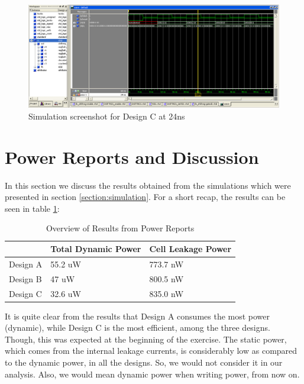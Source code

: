 \documentclass[11pt,a4paper]{article}
\begin{document}
\begin{figure}[htp]
\centering
\includegraphics[length = 4in,width = 6.5in]{./images/simsrg2.png}
\caption{Simulation screenshot for Design C at 24ns}
\end{figure}

\newpage
\section{Power Reports and Discussion}
\label{section:power}

In this section we discuss the results obtained from the simulations which were presented in section \ref{section:simulation}. For a short recap, the results can be seen in table \ref{table:power}:

\begin{table}[htbp]
\begin{center}
\begin{tabular}{|l|l|l|}
\hline
\textbf{}	& \textbf{Total Dynamic Power}		& \textbf{Cell Leakage Power}\\ \hline
Design A &	55.2 uW				& 773.7 nW \\ \hline
Design B &	47 uW					& 800.5 nW \\ \hline
Design C &  32.6 uW				& 835.0 nW \\ \hline
\end{tabular}
\end{center}
\caption{Overview of Results from Power Reports}
\label{table:power}
\end{table}

It is quite clear from the results that Design A consumes the most power (dynamic), while Design C is the most efficient, among the three designs. Though, this was expected at the beginning of the exercise. The static power, which comes from the internal leakage currents, is considerably low as compared to the dynamic power, in all the designs. So, we would not consider it in our analysis. Also, we would mean dynamic power when writing power, from now on.
\end{document}
